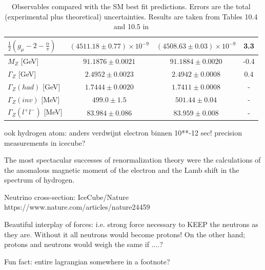 \begin{table}[]
\begin{tabular}{|l|c|c|c|}
$\frac{1}{2}\left(g_\mu - 2 - \frac{\alpha}{\pi} \right)$ & $\left( 4511.18 \pm 0.77\right) \times 10^{-9}$ & $\left(4508.63 \pm 0.03 \right) \times 10^{-9}$ & 3.3               \\ \hline
$M_Z$ {[}GeV{]}                                           & $91.1876 \pm 0.0021$                            & $91.1884 \pm 0.0020$                            & -0.4              \\ \hline
$\Gamma_Z$ {[}GeV{]}                                      & $2.4952 \pm 0.0023$                             & $2.4942 \pm 0.0008$                             & 0.4               \\ \hline
$\Gamma_Z (had)$ {[}GeV{]}                                & $1.7444 \pm 0.0020$                             & $1.7411 \pm 0.0008$                             & -                 \\ \hline
$\Gamma_Z (inv)$ {[}MeV{]}                                & $499.0 \pm 1.5$                                 & $501.44 \pm 0.04$                               & -                 \\ \hline
$\Gamma_Z \left(l^+ l^- \right)$ {[}MeV{]}                & $83.984 \pm 0.086$                              & $83.959 \pm 0.008$                              & -                 \\ \hline
\end{tabular}
\caption{Observables compared with the SM best fit predictions. Errors are the total (experimental plus theoretical) uncertainties. Results are taken from Tables 10.4 and 10.5 in \cite{PDG2018url}}
\label{tab:precision}
\end{table}



ook hydrogen atom: anders verdwijnt electron binnen 10**-12 sec!
precision measurements in icecube?


The most spectacular successes of renormalization theory were the calculations of the anomalous magnetic moment of the electron and the Lamb shift in the spectrum of hydrogen.

Neutrino cross-section: IceCube/Nature https://www.nature.com/articles/nature24459


Beautiful interplay of forces: i.e. strong force necessary to KEEP the neutrons as they are. Without it all neutrons would become protons! On the other hand; protons and neutrons would weigh the same if ....?


Fun fact: entire lagrangian somewhere in a footnote?

